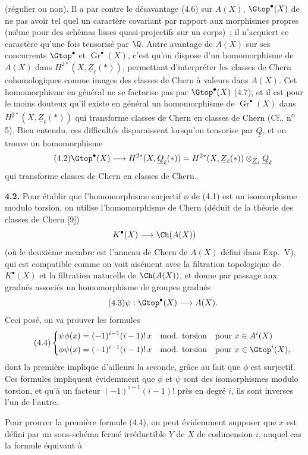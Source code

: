 
(régulier ou non). Il a par contre le désavantage (4.6) sur $A(X)$, $\Gtop^\bullet(X)$ de ne pas avoir tel quel un caractère covariant par rapport aux morphismes propres (même pour des schémas lisses quasi-projectifs sur un corps)~; il n'acquiert ce caractère qu'une fois tensorisé par $\Q$. Autre avantage de $A(X)$ sur ses concurrents $\Gtop^\bullet$ et $\operatorname{Gr}^\bullet(X)$, c'est qu'on dispose d'un homomorphisme de $A(X)$ dans $H^{2*}(X,\underline{Z}_\ell(*))$, permettant d'interpréter les classes de Chern cohomologiques comme images des classes de Chern à valeurs dans $A(X)$. Cet homomorphisme en général ne se factorise pas par $\Gtop^\bullet(X)$ (4.7), et il est pour le moins douteux qu'il existe en général un homomorphisme de $\operatorname{Gr}^\bullet(X)$ dans $H^{2*}(X,\underline{Z}_\ell(*))$ qui transforme classes de Chern en classes de Chern (Cf.. n\textsuperscript{o} 5). Bien entendu, ces difficultés disparaissent lorsqu'on tensorise par $\underline{Q}$, et on trouve un homomorphisme
\begin{equation}\tag{4.2}
 \Gtop^\bullet(X)\longrightarrow H^{2*}(X,\underline{Q}_\ell(*))=
 H^{2*}(X,\underline{Z}_\ell(*))\otimes_{\underline{Z}_\ell}\underline{Q}_\ell
\end{equation}
qui transforme classes de Chern en classes de Chern.

\textbf{4.2.} Pour établir que l'homomorphisme surjectif $\phi$ de (4.1) est un isomorphisme modulo torsion, on utilise l'homomorphisme de Chern (déduit de la théorie des classes de Chern [9])
\[
 K^\bullet(X)\longrightarrow \Ch(A(X))
\]
(où le deuxième membre est l'anneau de Chern de $A(X)$ défini dans Exp.~V), qui est compatible comme on voit aisément avec la filtration topologique de $K^\bullet(X)$ et la filtration naturelle de $\Ch(A(X))$, et donne par passage aux gradués associés un homomorphisme de groupes gradués
\begin{equation}\tag{4.3}
 \psi:\Gtop^\bullet(X)\longrightarrow A(X).
\end{equation}
Ceci posé, on va prouver les formules
\begin{equation}\tag{4.4}
\left\{
\begin{aligned}
 \psi\phi(x)&=(-1)^{i-1}(i-1)!\,x\quad \text{mod. torsion}\quad \text{pour } x\in A^i(X)\\
 \phi\psi(x)&=(-1)^{i-1}(i-1)!\,x\quad \text{mod. torsion}\quad \text{pour } x\in \Gtop^i(X),
\end{aligned}
\right.
\end{equation}
dont la première implique d'ailleurs la seconde, grâce au fait que $\phi$ est surjectif. Ces formules impliquent évidemment que $\phi$ et $\psi$ sont des isomorphismes modulo torsion, et qu'à un facteur $(-1)^{i-1}(i-1)!$ près en degré $i$, ils sont inverses l'un de l'autre.

Pour prouver la première formule (4.4), on peut évidemment supposer que $x$ est défini par un sous-schéma fermé irréductible $Y$ de $X$ de codimension $i$, auquel cas la formule équivaut à
